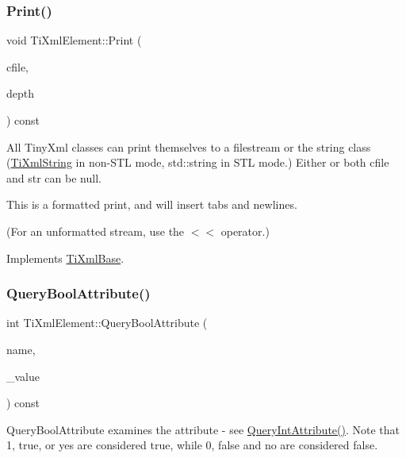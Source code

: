 \subsubsection{\texorpdfstring{Print()}{Print()}}
{\footnotesize\ttfamily void Ti\+Xml\+Element\+::\+Print (\begin{DoxyParamCaption}\item[{F\+I\+LE $\ast$}]{cfile,  }\item[{int}]{depth }\end{DoxyParamCaption}) const\hspace{0.3cm}{\ttfamily [virtual]}}

All Tiny\+Xml classes can print themselves to a filestream or the string class (\hyperlink{class_ti_xml_string}{Ti\+Xml\+String} in non-\/\+S\+TL mode, std\+::string in S\+TL mode.) Either or both cfile and str can be null.

This is a formatted print, and will insert tabs and newlines.

(For an unformatted stream, use the $<$$<$ operator.) 

Implements \hyperlink{class_ti_xml_base_a0de56b3f2ef14c65091a3b916437b512}{Ti\+Xml\+Base}.

\mbox{\label{class_ti_xml_element_a5789b1488af75b6ae37a749700495ceb}} 
\subsubsection{\texorpdfstring{Query\+Bool\+Attribute()}{QueryBoolAttribute()}}
{\footnotesize\ttfamily int Ti\+Xml\+Element\+::\+Query\+Bool\+Attribute (\begin{DoxyParamCaption}\item[{const char $\ast$}]{name,  }\item[{bool $\ast$}]{\+\_\+value }\end{DoxyParamCaption}) const}

Query\+Bool\+Attribute examines the attribute -\/ see \hyperlink{class_ti_xml_element_a5c0f739e0f6f5905a201364532e54a60}{Query\+Int\+Attribute()}. Note that \textquotesingle{}1\textquotesingle{}, \textquotesingle{}true\textquotesingle{}, or \textquotesingle{}yes\textquotesingle{} are considered true, while \textquotesingle{}0\textquotesingle{}, \textquotesingle{}false\textquotesingle{} and \textquotesingle{}no\textquotesingle{} are considered false. \mbox{\label{class_ti_xml_element_a5c0f739e0f6f5905a201364532e54a60}} 
